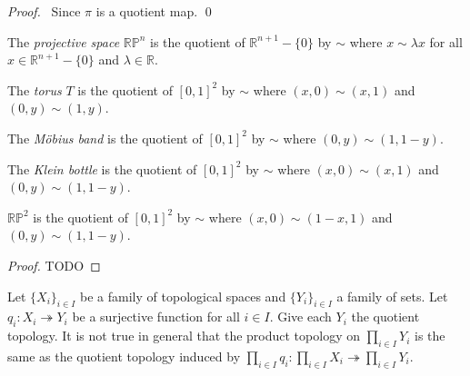 \begin{proof}
\pf\ Since $\pi$ is a quotient map. \qed
\end{proof}

\begin{df}
The \emph{projective space} $\mathbb{RP}^n$ is the quotient of $\mathbb{R}^{n+1} - \{0\}$ by $\sim$ where $x \sim \lambda x$ for all $x \in \mathbb{R}^{n+1} - \{0\}$ and $\lambda \in \mathbb{R}$.
\end{df}

\begin{df}[Torus]
The \emph{torus} $T$ is the quotient of $[0,1]^2$ by $\sim$ where $(x,0) \sim (x,1)$ and $(0,y) \sim (1,y)$.
\end{df}

\begin{df}
The \emph{M\"{o}bius band} is the quotient of $[0,1]^2$ by $\sim$ where $(0,y) \sim (1,1-y)$.
\end{df}

\begin{df}
The \emph{Klein bottle} is the quotient of $[0,1]^2$ by $\sim$ where $(x,0) \sim (x,1)$ and $(0,y) \sim (1,1-y)$.
\end{df}

\begin{prop}
$\mathbb{RP}^2$ is the quotient of $[0,1]^2$ by $\sim$ where $(x,0) \sim (1-x,1)$ and $(0,y) \sim (1,1-y)$.
\end{prop}

\begin{proof}
\pf TODO
\end{proof}

\begin{ex}
Let $\{X_i\}_{i \in I}$ be a family of topological spaces and $\{Y_i\}_{i \in I}$ a family of sets. Let $q_i : X_i \twoheadrightarrow Y_i$ be a surjective function for all $i \in I$. Give each $Y_i$ the quotient topology. It is not true in general that the product topology on $\prod_{i \in I} Y_i$ is the same as the quotient topology induced by $\prod_{i \in I} q_i : \prod_{i \in I} X_i \twoheadrightarrow \prod_{i \in I} Y_i$.
\end{ex}

